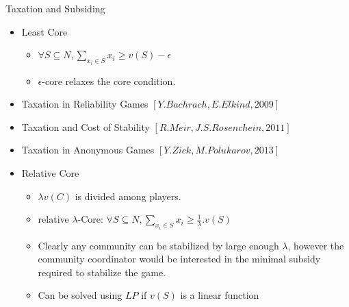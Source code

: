 \documentclass{beamer}
\begin{document}
\begin{frame}{Taxation and Subsiding}
    \begin{itemize}
        \item Least Core
        \begin{itemize}
            \item $\forall S \subseteq N, \sum_{x_i \in S} x_i \geq v(S) - \epsilon$
            \item $\epsilon$-core relaxes the core condition.
        \end{itemize}
        \item Taxation in Reliability Games \small $[Y. Bachrach, E. Elkind, 2009]$

        \item Taxation and Cost of Stability \small $[R. Meir, J. S. Rosenchein, 2011]$

        \item Taxation in Anonymous Games \small $[Y. Zick, M. Polukarov, 2013]$

        \item Relative Core
        \begin{itemize}
            \item $\lambda v(C)$ is divided among players.
            \item relative $\lambda$-Core: $\forall S \subseteq N, \sum_{x_i \in S} x_i \geq \frac{1}{\lambda}.v(S)$
            \item Clearly any community can be stabilized by large enough $\lambda$, however the community coordinator would be interested in the minimal subsidy required to stabilize the game.
            \item Can be solved using $LP$ if $v(S)$ is a linear function
        \end{itemize}
    \end{itemize}
\end{frame}
\end{document}
